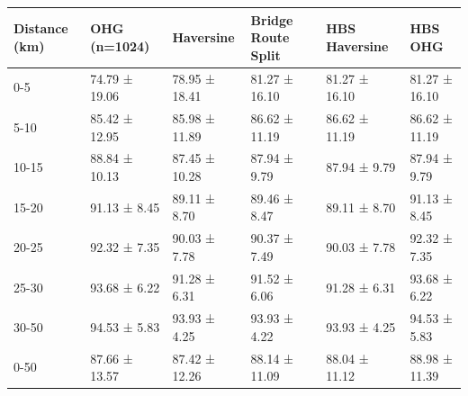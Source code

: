 \begin{tabular}{llllll}
\toprule
Distance (km) & OHG (n=1024) & Haversine & Bridge Route Split & HBS Haversine & HBS OHG \\
\midrule
0-5 & 74.79 ± 19.06 & 78.95 ± 18.41 & 81.27 ± 16.10 & 81.27 ± 16.10 & 81.27 ± 16.10 \\
5-10 & 85.42 ± 12.95 & 85.98 ± 11.89 & 86.62 ± 11.19 & 86.62 ± 11.19 & 86.62 ± 11.19 \\
10-15 & 88.84 ± 10.13 & 87.45 ± 10.28 & 87.94 ± 9.79 & 87.94 ± 9.79 & 87.94 ± 9.79 \\
15-20 & 91.13 ± 8.45 & 89.11 ± 8.70 & 89.46 ± 8.47 & 89.11 ± 8.70 & 91.13 ± 8.45 \\
20-25 & 92.32 ± 7.35 & 90.03 ± 7.78 & 90.37 ± 7.49 & 90.03 ± 7.78 & 92.32 ± 7.35 \\
25-30 & 93.68 ± 6.22 & 91.28 ± 6.31 & 91.52 ± 6.06 & 91.28 ± 6.31 & 93.68 ± 6.22 \\
30-50 & 94.53 ± 5.83 & 93.93 ± 4.25 & 93.93 ± 4.22 & 93.93 ± 4.25 & 94.53 ± 5.83 \\
0-50 & 87.66 ± 13.57 & 87.42 ± 12.26 & 88.14 ± 11.09 & 88.04 ± 11.12 & 88.98 ± 11.39 \\
\bottomrule
\end{tabular}
